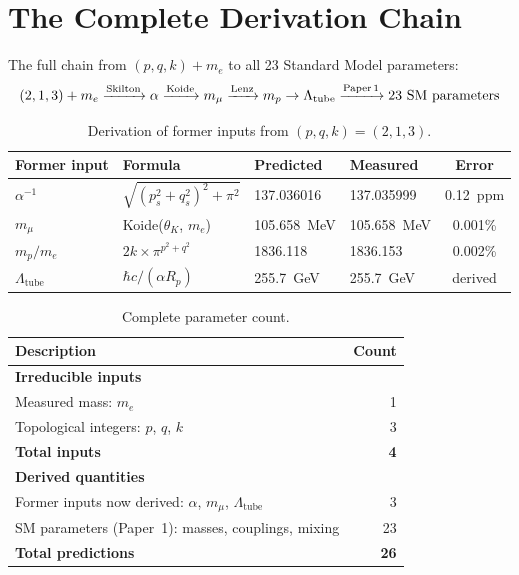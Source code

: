 \documentclass[11pt,a4paper]{article}
\begin{document}
\section{The Complete Derivation Chain}
\label{sec:chain}

The full chain from $(p, q, k) + m_e$ to all 23 Standard Model parameters:
\begin{equation}
  (2, 1, 3) + m_e \xrightarrow{\text{Skilton}} \alpha \xrightarrow{\text{Koide}} m_\mu \xrightarrow{\text{Lenz}} m_p \to \Lambda_{\text{tube}} \xrightarrow{\text{Paper\,1}} \text{23 SM parameters}
\end{equation}

\begin{table}[h]
\centering
\caption{Derivation of former inputs from $(p, q, k) = (2, 1, 3)$.}
\label{tab:derivation}
\begin{tabular}{@{}llllc@{}}
\toprule
Former input & Formula & Predicted & Measured & Error \\
\midrule
$\alpha^{-1}$ & $\sqrt{(p_s^2+q_s^2)^2+\pi^2}$ & 137.036016 & 137.035999 & 0.12~ppm \\
$m_\mu$ & Koide($\theta_K$, $m_e$) & 105.658~MeV & 105.658~MeV & 0.001\% \\
$m_p/m_e$ & $2k \times \pi^{p^2+q^2}$ & 1836.118 & 1836.153 & 0.002\% \\
$\Lambda_{\text{tube}}$ & $\hbar c/(\alpha R_p)$ & 255.7~GeV & 255.7~GeV & derived \\
\bottomrule
\end{tabular}
\end{table}

\begin{table}[h]
\centering
\caption{Complete parameter count.}
\label{tab:count}
\begin{tabular}{@{}lr@{}}
\toprule
Description & Count \\
\midrule
\textbf{Irreducible inputs} & \\
\quad Measured mass: $m_e$ & 1 \\
\quad Topological integers: $p$, $q$, $k$ & 3 \\
\textbf{Total inputs} & \textbf{4} \\
\midrule
\textbf{Derived quantities} & \\
\quad Former inputs now derived: $\alpha$, $m_\mu$, $\Lambda_{\text{tube}}$ & 3 \\
\quad SM parameters (Paper~1): masses, couplings, mixing & 23 \\
\textbf{Total predictions} & \textbf{26} \\
\bottomrule
\end{tabular}
\end{table}
\end{document}
